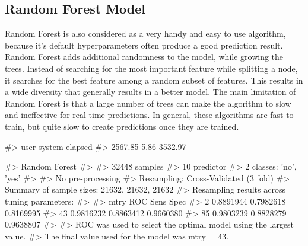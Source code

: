 \hypertarget{random-forest-model}{%
\subsection{Random Forest Model}\label{random-forest-model}}

Random Forest is also considered as a very handy and easy to use
algorithm, because it's default hyperparameters often produce a good
prediction result. Random Forest adds additional randomness to the
model, while growing the trees. Instead of searching for the most
important feature while splitting a node, it searches for the best
feature among a random subset of features. This results in a wide
diversity that generally results in a better model. The main limitation
of Random Forest is that a large number of trees can make the algorithm
to slow and ineffective for real-time predictions. In general, these
algorithms are fast to train, but quite slow to create predictions once
they are trained.

\begin{Schunk}
\begin{Soutput}
#>    user  system elapsed 
#> 2567.85    5.86 3532.97
\end{Soutput}
\begin{Soutput}
#> Random Forest 
#> 
#> 32448 samples
#>    10 predictor
#>     2 classes: 'no', 'yes' 
#> 
#> No pre-processing
#> Resampling: Cross-Validated (3 fold) 
#> Summary of sample sizes: 21632, 21632, 21632 
#> Resampling results across tuning parameters:
#> 
#>   mtry  ROC        Sens       Spec     
#>    2    0.8891944  0.7982618  0.8169995
#>   43    0.9816232  0.8863412  0.9660380
#>   85    0.9803239  0.8828279  0.9638807
#> 
#> ROC was used to select the optimal model using the largest value.
#> The final value used for the model was mtry = 43.
\end{Soutput}
\end{Schunk}

